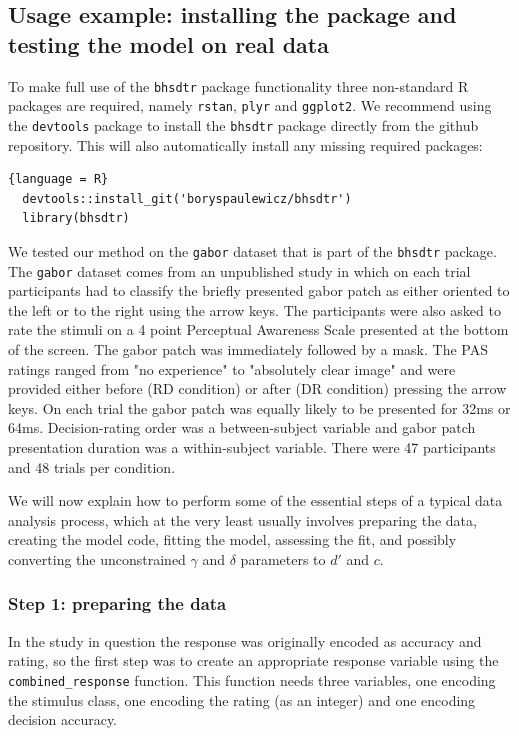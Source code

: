 \documentclass[oneside,a4paper]{article}
\begin{document}
\subsection{Usage example: installing the package and testing the
  model on real data}

To make full use of the \texttt{bhsdtr} package functionality three
non-standard R packages are required, namely \texttt{rstan},
\texttt{plyr} and \texttt{ggplot2}. We recommend using the
\texttt{devtools} package to install the \texttt{bhsdtr} package
directly from the github repository. This will also automatically
install any missing required packages:

\begin{lstlisting}{language = R}
  devtools::install_git('boryspaulewicz/bhsdtr')
  library(bhsdtr)
\end{lstlisting}

We tested our method on the \texttt{gabor} dataset that is part of the
\texttt{bhsdtr} package. The \texttt{gabor} dataset comes from an
unpublished study in which on each trial participants had to classify
the briefly presented gabor patch as either oriented to the left or to
the right using the arrow keys. The participants were also asked to
rate the stimuli on a 4 point Perceptual Awareness Scale
\cite{ramsoy2004introspection} presented at the bottom of the
screen. The gabor patch was immediately followed by a mask. The PAS
ratings ranged from "no experience" to "absolutely clear image" and
were provided either before (RD condition) or after (DR condition)
pressing the arrow keys. On each trial the gabor patch was equally
likely to be presented for 32ms or 64ms. Decision-rating order was a
between-subject variable and gabor patch presentation duration was a
within-subject variable. There were 47 participants and 48 trials per
condition.

We will now explain how to perform some of the essential steps of a
typical data analysis process, which at the very least usually
involves preparing the data, creating the model code, fitting the
model, assessing the fit, and possibly converting the unconstrained
$\gamma$ and $\delta$ parameters to $d'$ and $c$.

\subsubsection{Step 1: preparing the data}

In the study in question the response was originally encoded as
accuracy and rating, so the first step was to create an appropriate
response variable using the \texttt{combined\_response} function. This
function needs three variables, one encoding the stimulus class, one
encoding the rating (as an integer) and one encoding decision
accuracy.
\end{document}
